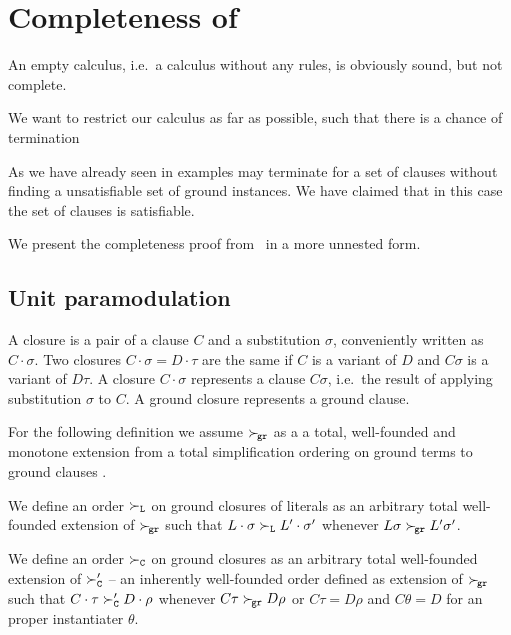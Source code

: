 
\chapter{Completeness of \InstGenEQ}

An empty calculus,
i.e.~a calculus without any rules,
is obviously sound, but not complete.


We want to restrict our calculus as far as possible,
such that there is a chance of termination

As we have already seen in examples \InstGenEQ
may terminate for a set of clauses without finding
a unsatisfiable set of ground instances.
We have claimed that in this case the set of clauses is satisfiable.



We present the completeness proof from~\cite{GK2004csl} in a more unnested form.


\section{Unit paramodulation}\label{sec:unit:paramodulation}

\begin{definition}
    A closure is a pair of a clause \(C\) and a substitution \(\sigma\),
    conveniently written as \(C\cdot\sigma\). Two closures \(C\cdot\sigma = D\cdot\tau\)
    are the same if \(C\) is a variant of \(D\) and \(C\sigma\) is a variant of \(D\tau\).
    A closure \(C\cdot\sigma\) represents a clause \(C\sigma\),
    i.e.~the result of applying substitution \(\sigma\) to \(C\).
    A ground closure represents a ground clause.
\end{definition}

For the following definition we assume
\(\mathrel\succ_{\!\mathtt{gr}}\) as a a total, well-founded and monotone extension
from a total simplification ordering on ground terms
to ground clauses \cite{NR2001}.

\begin{definition}
    We define an order \(\mathrel\succ_{\mathtt{L}}\) on ground closures of literals
    as an arbitrary total well-founded extension of \(\mathrel\succ_{\!\mathtt{gr}}\)
    such that
    \(L\cdot\sigma\mathrel\succ_{\mathtt{L}} L'\cdot\sigma'\) whenever
    \(L\sigma\mathrel\succ_{\!\mathtt{gr}} L'\sigma'\).

    We define an order \( \mathrel\succ_{\mathtt{C}} \) on ground closures
    as an arbitrary total well-founded extension of
    \(\mathrel\succ_{\mathtt{C}}'\) -- an inherently well-founded order defined as extension of \(\mathrel\succ_{\!\mathtt{gr}}\)
    such that
    \(C\cdot\tau\mathrel\succ_{\mathtt{C}}' D\cdot\rho\) whenever
    \(C\tau\mathrel\succ_{\!\mathtt{gr}} D\rho\) or \(C\tau = D\rho\) and \(C\theta = D\) for an proper instantiater \(\theta\).
\end{definition}

